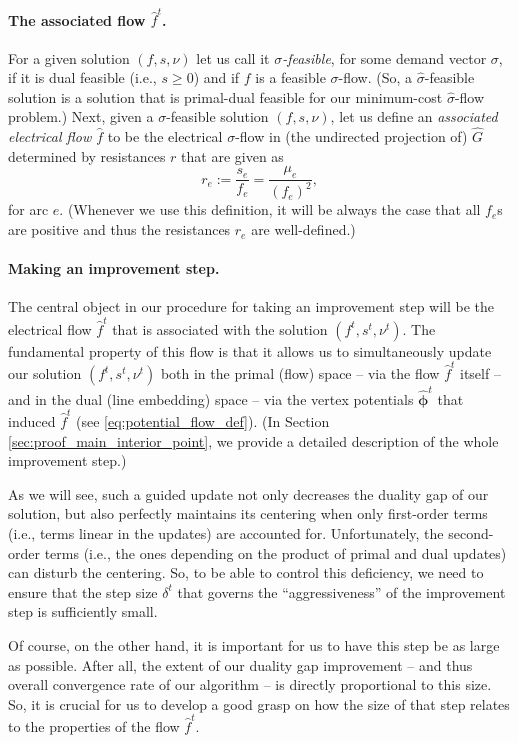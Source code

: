 \documentclass[11pt, letterpaper]{article}
\newcommand{\hG}{\widehat{G}}
\newcommand{\vnu}{\boldsymbol{\mathit{\nu}}}
\newcommand{\vsigma}{\boldsymbol{\mathit{\sigma}}}
\newcommand{\hvsigma}{\boldsymbol{\mathit{\hat{\sigma}}}}
\newcommand{\hvphi}{\boldsymbol{\widehat{\phi}}}
\newcommand{\ff}{\boldsymbol{\mathit{f}}}
\newcommand{\hff}{\boldsymbol{\mathit{\hat{f}}}}
\newcommand{\rr}{\boldsymbol{\mathit{r}}}
\renewcommand{\ss}{\boldsymbol{\mathit{s}}}
\begin{document}
\paragraph{The associated flow $\hff^t$.} For a given solution $(\ff,\ss,\vnu)$ let us call it {\em $\vsigma$-feasible}, for some demand vector $\vsigma$, if it is dual feasible (i.e., $\ss\geq 0$) and if $\ff$ is a feasible $\vsigma$-flow. (So, a $\hvsigma$-feasible solution is a solution that is primal-dual feasible for our minimum-cost $\hvsigma$-flow problem.) Next, given a $\vsigma$-feasible solution $(\ff,\ss,\vnu)$, let us define an {\em associated electrical flow $\hff$} to be the electrical $\vsigma$-flow in (the undirected projection of) $\hG$ determined by resistances $\rr$ that are given as
\begin{equation}
\label{eq:hf_resistances}
r_e := \frac{s_e}{f_e} = \frac{\mu_e}{(f_e)^2},
\end{equation}
for arc $e$. (Whenever we use this definition, it will be always the case that all $f_e$s are positive and thus the resistances $r_e$ are well-defined.)

 \paragraph{Making an improvement step.} The central object in our procedure for taking an improvement step will be the electrical flow $\hff^t$ that is associated with the solution $(\ff^t,\ss^t,\vnu^t)$. The fundamental property of this flow is that it allows us to simultaneously update our solution $(\ff^t,\ss^t,\vnu^t)$ {both} in the primal (flow) space -- via the flow $\hff^t$ itself -- and in the dual (line embedding) space -- via the vertex potentials $\hvphi^t$ that induced $\hff^t$ (see \eqref{eq:potential_flow_def}). (In Section \ref{sec:proof_main_interior_point}, we provide a detailed description of the whole improvement step.)

 As we will see, such a guided update not only decreases the duality gap of our solution, but also perfectly maintains its centering when only first-order terms (i.e., terms linear in the updates) are accounted for. Unfortunately, the second-order terms (i.e., the ones depending on the product of primal and dual updates) can disturb the centering. So, to be able to control this deficiency, we need to ensure that the step size $\delta^t$ that governs the ``aggressiveness'' of the improvement step is sufficiently small. 
 
Of course, on the other hand, it is important for us to have this step be as large as possible. After all, the extent of our duality gap improvement -- and thus overall convergence rate of our algorithm -- is directly proportional to this size. So, it is crucial for us to develop a good grasp on how the size of that step relates to the properties of the flow $\hff^t$. 
\end{document}
